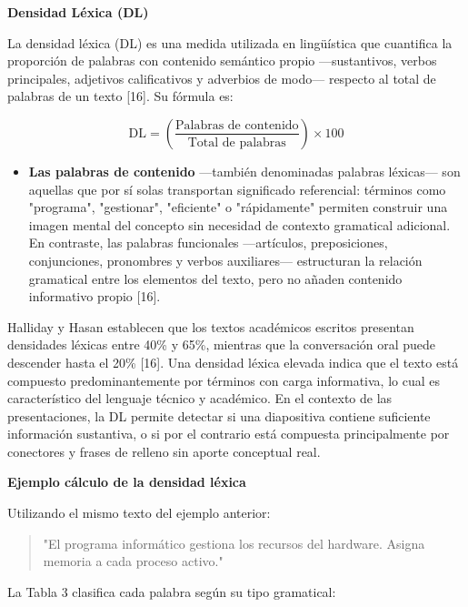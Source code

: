 \documentclass[11pt]{article}
\begin{document}
\textbf{Densidad Léxica (DL)}

La densidad léxica (DL) es una medida utilizada en lingüística que cuantifica la proporción de palabras con contenido semántico propio —sustantivos, verbos principales, adjetivos calificativos y adverbios de modo— respecto al total de palabras de un texto [16]. Su fórmula es:

\[
\mathrm{DL} = \left( \frac{\text{Palabras de contenido}}{\text{Total de palabras}} \right) \times 100
\]

\begin{itemize}
    \item \textbf{Las palabras de contenido } —también denominadas palabras léxicas— son aquellas que por sí solas transportan significado referencial: términos como "programa", "gestionar", "eficiente" o "rápidamente" permiten construir una imagen mental del concepto sin necesidad de contexto gramatical adicional. En contraste, las palabras funcionales —artículos, preposiciones, conjunciones, pronombres y verbos auxiliares— estructuran la relación gramatical entre los elementos del texto, pero no añaden contenido informativo propio [16].
\end{itemize}

Halliday y Hasan establecen que los textos académicos escritos presentan densidades léxicas entre 40\% y 65\%, mientras que la conversación oral puede descender hasta el 20\% [16]. Una densidad léxica elevada indica que el texto está compuesto predominantemente por términos con carga informativa, lo cual es característico del lenguaje técnico y académico. En el contexto de las presentaciones, la DL permite detectar si una diapositiva contiene suficiente información sustantiva, o si por el contrario está compuesta principalmente por conectores y frases de relleno sin aporte conceptual real.

\textbf{Ejemplo cálculo de la densidad léxica}

Utilizando el mismo texto del ejemplo anterior: 
\begin{quote}
"El programa informático gestiona los recursos del hardware. Asigna memoria a cada proceso activo."
\end{quote}
\newpage
La Tabla 3 clasifica cada palabra según su tipo gramatical:
\end{document}
